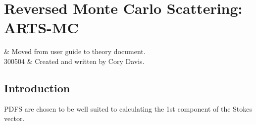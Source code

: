 \graphicspath{{Figs/montecarlo/}}

%
%
\chapter{Reversed Monte Carlo Scattering: ARTS-MC}
 \label{sec:montecarlo}


%
%
 & Moved from user guide to theory document.\\
  300504 & Created and written by Cory Davis.\\
\stophistory


%
%
%

%
%




\section{Introduction}
 \label{sec:montecarlo:intro}

PDFS are chosen to be well suited to calculating the 1st component of
the Stokes vector.

